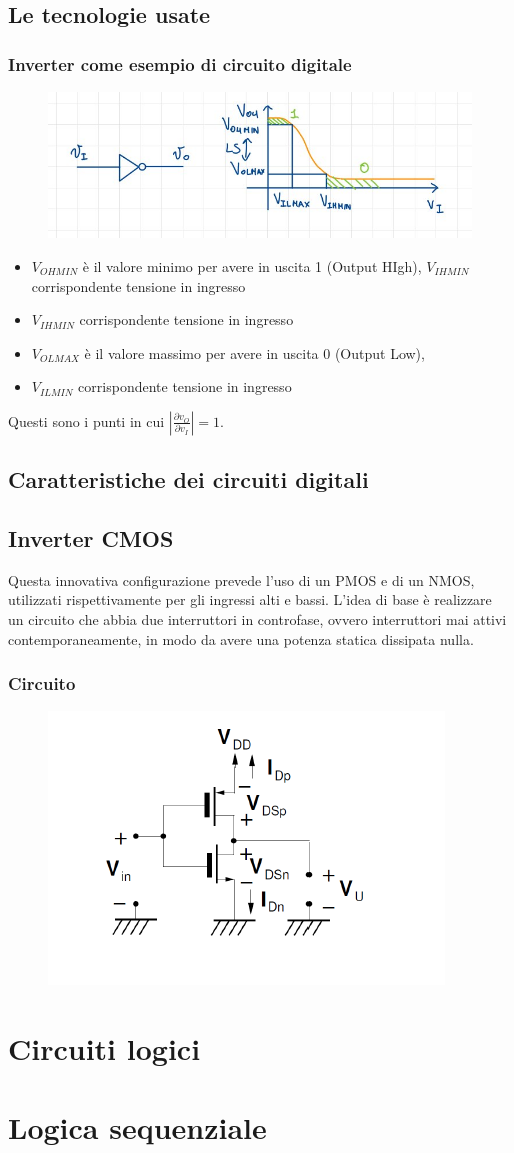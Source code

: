 \documentclass[11pt,a4paper,]{article}
\begin{document}
\subsection{Le tecnologie usate}
\subsubsection{Inverter come esempio di circuito digitale}
\begin{figure}[H]
    \centering
    \includegraphics[width=0.5\linewidth]{img/inv dig.png}
\end{figure}
\begin{itemize}
    \item $V_{OHMIN}$ è il valore minimo per avere in uscita 1 (Output HIgh), $V_{IHMIN}$ corrispondente tensione in ingresso
    \item $V_{IHMIN}$ corrispondente tensione in ingresso
    \item $V_{OLMAX}$ è il valore massimo per avere in uscita 0 (Output Low), 
    \item $V_{ILMIN}$ corrispondente tensione in ingresso
\end{itemize}
Questi sono i punti in cui $|\frac{\partial v_O}{\partial v_I}|=1$.

\subsection{Caratteristiche dei circuiti digitali}
\subsection{Inverter CMOS}
Questa innovativa configurazione prevede l'uso di un PMOS e di un NMOS, utilizzati rispettivamente per gli ingressi alti e bassi. 
L'idea di base è realizzare un circuito che abbia due interruttori in controfase, ovvero interruttori mai attivi contemporaneamente, in modo da avere una potenza statica dissipata nulla.
\subsubsection{Circuito}
\begin{figure}[H]
    \centering
    \includegraphics[width=0.25\linewidth]{img/in cmos.png}
\end{figure}


\section{Circuiti logici}

\section{Logica sequenziale}
\end{document}
